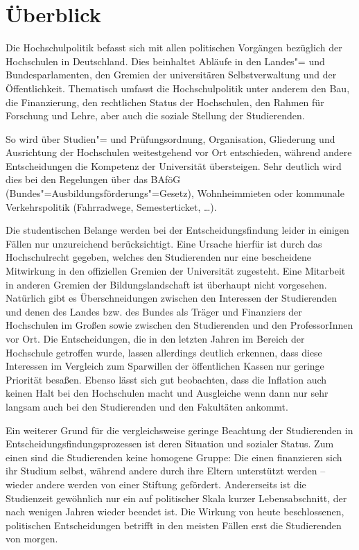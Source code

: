 \section{Überblick}
\label{hopo}

Die Hochschulpolitik befasst sich mit allen politischen Vorgängen bezüglich der Hochschulen in Deutschland. Dies beinhaltet Abläufe in den Landes"= und Bundesparlamenten, den Gremien der universitären Selbstverwaltung und der Öffentlichkeit. Thematisch umfasst die Hochschulpolitik unter anderem den Bau, die Finanzierung, den rechtlichen Status der Hochschulen, den Rahmen für Forschung und Lehre, aber auch die soziale Stellung der Studierenden.

So wird über Studien"= und Prüfungsordnung, Organisation, Gliederung und Ausrichtung der Hochschulen weitestgehend vor Ort entschieden, während andere Entscheidungen die Kompetenz der Universität übersteigen. Sehr deutlich wird dies bei den Regelungen über das BAföG (Bundes"=Ausbildungsförderungs"=Gesetz), Wohnheimmieten oder kommunale Verkehrspolitik (Fahrradwege, Semesterticket,
\dots).

Die studentischen Belange werden bei der Entscheidungsfindung leider in einigen Fällen nur unzureichend berücksichtigt. Eine Ursache hierfür ist durch das Hochschulrecht gegeben, welches den Studierenden nur eine bescheidene Mitwirkung in den offiziellen Gremien der Universität zugesteht. Eine Mitarbeit in anderen Gremien der Bildungslandschaft ist überhaupt nicht vorgesehen. Natürlich gibt es Überschneidungen zwischen den Interessen der Studierenden und denen des Landes bzw. des Bundes als Träger und Finanziers der Hochschulen im Großen sowie zwischen den Studierenden und den ProfessorInnen vor Ort. Die Entscheidungen, die in den letzten Jahren im Bereich der Hochschule getroffen wurde, lassen allerdings deutlich erkennen, dass diese Interessen im Vergleich zum Sparwillen der öffentlichen Kassen nur geringe Priorität besaßen. Ebenso lässt sich gut beobachten, dass die Inflation auch keinen Halt bei den Hochschulen macht und Ausgleiche wenn dann nur sehr langsam auch bei den Studierenden und den Fakultäten ankommt.

Ein weiterer Grund für die vergleichsweise geringe Beachtung der Studierenden in Entscheidungsfindungsprozessen ist deren Situation und sozialer Status. Zum einen sind die Studierenden keine homogene Gruppe: Die einen finanzieren sich ihr Studium selbst, während andere durch ihre Eltern unterstützt werden -- wieder andere werden von einer Stiftung gefördert. Andererseits ist die Studienzeit gewöhnlich nur ein auf politischer Skala kurzer Lebensabschnitt, der nach wenigen Jahren wieder beendet ist. Die Wirkung von heute beschlossenen, politischen Entscheidungen betrifft in den meisten Fällen erst die Studierenden von morgen.


